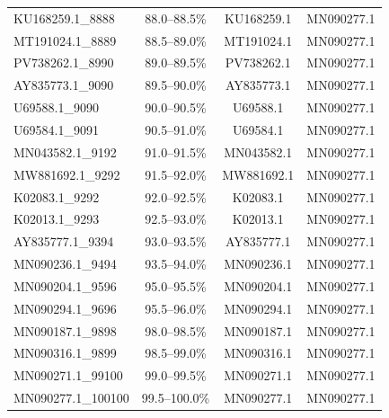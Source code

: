 \begin{table}[htbp]
\begin{tabular}{lccc}
        KU168259.1\_8888 & 88.0--88.5\% & KU168259.1 & MN090277.1  \\
        MT191024.1\_8889 & 88.5--89.0\% & MT191024.1 & MN090277.1  \\
        PV738262.1\_8990 & 89.0--89.5\% & PV738262.1 & MN090277.1  \\
        AY835773.1\_9090 & 89.5--90.0\% & AY835773.1 & MN090277.1  \\
        U69588.1\_9090 & 90.0--90.5\% & U69588.1 & MN090277.1  \\
        U69584.1\_9091 & 90.5--91.0\% & U69584.1 & MN090277.1  \\
        MN043582.1\_9192 & 91.0--91.5\% & MN043582.1 & MN090277.1  \\
        MW881692.1\_9292 & 91.5--92.0\% & MW881692.1 & MN090277.1  \\
        K02083.1\_9292 & 92.0--92.5\% & K02083.1 & MN090277.1  \\
        K02013.1\_9293 & 92.5--93.0\% & K02013.1 & MN090277.1  \\
        AY835777.1\_9394 & 93.0--93.5\% & AY835777.1 & MN090277.1  \\
        MN090236.1\_9494 & 93.5--94.0\% & MN090236.1 & MN090277.1  \\
        MN090204.1\_9596 & 95.0--95.5\% & MN090204.1 & MN090277.1  \\
        MN090294.1\_9696 & 95.5--96.0\% & MN090294.1 & MN090277.1  \\
        MN090187.1\_9898 & 98.0--98.5\% & MN090187.1 & MN090277.1  \\
        MN090316.1\_9899 & 98.5--99.0\% & MN090316.1 & MN090277.1  \\
        MN090271.1\_99100 & 99.0--99.5\% & MN090271.1 & MN090277.1  \\
        MN090277.1\_100100 & 99.5--100.0\% & MN090277.1 & MN090277.1 \\
        \bottomrule
    \end{tabular}
\end{table}

\newpage
